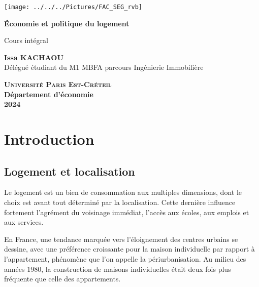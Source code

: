 \documentclass[a4paper, 12pt]{report}
\begin{document}
	
	\begin{titlepage}
		\centering
		\begin{center}
		\texttt{[image: ../../../Pictures/FAC\_SEG\_rvb]}
		\end{center}
		\vspace*{2cm}
		
		\Huge
		
		\textbf{Économie et politique du logement}
		\vspace{1.5cm}
		
		\Large
	Cours intégral
		
		\vspace{2cm}
		
		\textbf{Issa KACHAOU} \\
		{\normalsize Délégué étudiant du M1 MBFA parcours Ingénierie Immobilière}
		
		
		\vfill
		
		\Large
		
		\textsc{\textbf{Université Paris Est-Créteil}}	 \\
		\textbf{Département d'économie} \\
		\textbf{2024}
		
	\end{titlepage}
	\thispagestyle{empty}
	\newpage
	\clearpage
	\mbox{}
	\thispagestyle{empty}
	
	\tableofcontents
	
	\thispagestyle{empty}
	\newpage
	\mbox{}
	\thispagestyle{empty} %
	\chapter*{Introduction}
	
\section{Logement et localisation}

Le logement est un bien de consommation aux multiples dimensions, dont le choix est avant tout déterminé par la localisation. Cette dernière influence fortement l'agrément du voisinage immédiat, l'accès aux écoles, aux emplois et aux services.

En France, une tendance marquée vers l’éloignement des centres urbains se dessine, avec une préférence croissante pour la maison individuelle par rapport à l’appartement, phénomène que l'on appelle la périurbanisation. Au milieu des années 1980, la construction de maisons individuelles était deux fois plus fréquente que celle des appartements.
\end{document}

